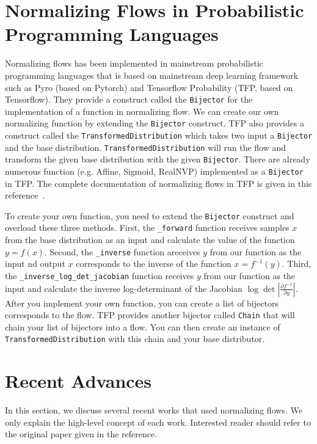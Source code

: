 \documentclass[runningheads]{llncs}
\begin{document}
\section{Normalizing Flows in Probabilistic Programming Languages}
Normalizing flows has been implemented in mainstream probabilistic programming languages that is based on mainstream deep learning framework such as Pyro (based on Pytorch) and Tensorflow Probability (TFP, based on Tensorflow). They provide a construct called the \texttt{Bijector} for the implementation of a function in normalizing flow. We can create our own normalizing function by extending the \texttt{Bijector} construct. TFP also provides a construct called the \texttt{TransformedDistribution} which takes two input a \texttt{Bijector} and the base distribution. \texttt{TransformedDistribution} will run the flow and transform the given base distribution with the given \texttt{Bijector}. There are already numerous function (e.g. Affine, Sigmoid, RealNVP) implemented as a \texttt{Bijector} in TFP. The complete documentation of normalizing flows in TFP is given in this reference~\cite{dillon2017tensorflow}.

To create your own function, you need to extend the \texttt{Bijector} construct and overload these three methods. First, the \texttt{\_forward} function receives samples $x$ from the base distribution as an input and calculate the value of the function $y = f(x)$. Second,  the \texttt{\_inverse} function areceives $y$ from our function as the input nd output $x$ corresponds to the inverse of the function $x = f^{-1}(y)$. Third, the \texttt{\_inverse\_log\_det\_jacobian} function receives $y$ from our function as the input and calculate the inverse log-determinant of the Jacobian $\log \det \left|\frac{\partial f^{-1}}{\partial y}\right|$. After you implement your own function, you can create a list of bijectors corresponds to the flow. TFP provides another bijector called \texttt{Chain} that will chain your list of bijectors into a flow. You can then create an instance of \texttt{TransformedDistribution} with this chain and your base distributor.   

\section{Recent Advances}
In this section, we discuss several recent works that used normalizing flows. We only explain the high-level concept of each work. Interested reader should refer to the original paper given in the reference.
\end{document}
